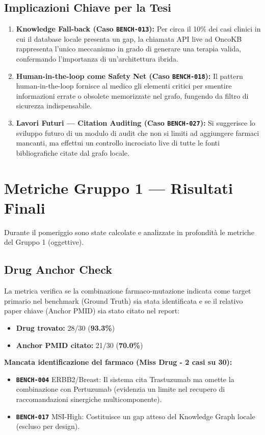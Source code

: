 \documentclass[12pt, a4paper]{article}
\newcommand{\bench}[1]{{\texttt{\textbf{#1}}}}
\begin{document}
\subsection{Implicazioni Chiave per la Tesi}
\begin{enumerate}[leftmargin=1.6em, itemsep=4pt]
  \item \textbf{Knowledge Fall-back (Caso \bench{BENCH-013}):} Per circa il 10\% dei casi clinici in cui il database locale presenta un gap, la chiamata API live ad OncoKB rappresenta l'unico meccanismo in grado di generare una terapia valida, confermando l'importanza di un'architettura ibrida.
  \item \textbf{Human-in-the-loop come Safety Net (Caso \bench{BENCH-018}):} Il pattern human-in-the-loop fornisce al medico gli elementi critici per smentire informazioni errate o obsolete memorizzate nel grafo, fungendo da filtro di sicurezza indispensabile.
  \item \textbf{Lavori Futuri --- Citation Auditing (Caso \bench{BENCH-027}):} Si suggerisce lo sviluppo futuro di un modulo di audit che non si limiti ad aggiungere farmaci mancanti, ma effettui un controllo incrociato live di tutte le fonti bibliografiche citate dal grafo locale.
\end{enumerate}

\section{Metriche Gruppo 1 --- Risultati Finali}

Durante il pomeriggio sono state calcolate e analizzate in profondità le metriche del Gruppo 1 (oggettive).

\subsection{Drug Anchor Check}
La metrica verifica se la combinazione farmaco-mutazione indicata come target primario nel benchmark (Ground Truth) sia stata identificata e se il relativo paper chiave (Anchor PMID) sia stato citato nel report:
\begin{itemize}[leftmargin=1.6em, itemsep=2pt]
  \item \textbf{Drug trovato:} 28/30 (\textbf{93.3\%})
  \item \textbf{Anchor PMID citato:} 21/30 (\textbf{70.0\%})
\end{itemize}

\textbf{Mancata identificazione del farmaco (Miss Drug - 2 casi su 30):}
\begin{itemize}[leftmargin=1.6em, itemsep=2pt]
  \item \bench{BENCH-004} ERBB2/Breast: Il sistema cita Trastuzumab ma omette la combinazione con Pertuzumab (evidenzia un limite nel recupero di raccomandazioni sinergiche multicomponente).
  \item \bench{BENCH-017} MSI-High: Costituisce un gap atteso del Knowledge Graph locale (escluso per design).
\end{itemize}
\end{document}

